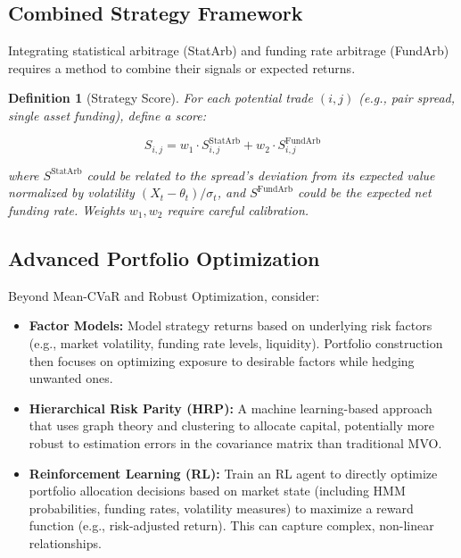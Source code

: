 \documentclass{article}
\newtheorem{definition}{Definition}
\begin{document}
\subsection{Combined Strategy Framework}

Integrating statistical arbitrage (StatArb) and funding rate arbitrage (FundArb) requires a method to combine their signals or expected returns.

\begin{definition}[Strategy Score]
For each potential trade $(i,j)$ (e.g., pair spread, single asset funding), define a score:

\begin{equation}
S_{i,j} = w_1 \cdot S_{i,j}^{\text{StatArb}} + w_2 \cdot S_{i,j}^{\text{FundArb}}
\end{equation}

where $S^{\text{StatArb}}$ could be related to the spread's deviation from its expected value normalized by volatility $(X_t - \theta_t) / \sigma_t$, and $S^{\text{FundArb}}$ could be the expected net funding rate. Weights $w_1, w_2$ require careful calibration.
\end{definition}

\subsection{Advanced Portfolio Optimization}

Beyond Mean-CVaR and Robust Optimization, consider:
\begin{itemize}
    \item \textbf{Factor Models:} Model strategy returns based on underlying risk factors (e.g., market volatility, funding rate levels, liquidity). Portfolio construction then focuses on optimizing exposure to desirable factors while hedging unwanted ones.
    \item \textbf{Hierarchical Risk Parity (HRP):} A machine learning-based approach that uses graph theory and clustering to allocate capital, potentially more robust to estimation errors in the covariance matrix than traditional MVO.
    \item \textbf{Reinforcement Learning (RL):} Train an RL agent to directly optimize portfolio allocation decisions based on market state (including HMM probabilities, funding rates, volatility measures) to maximize a reward function (e.g., risk-adjusted return). This can capture complex, non-linear relationships.
\end{itemize}
\end{document}
